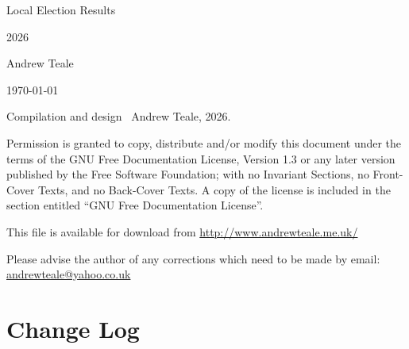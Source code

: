 \documentclass[a4paper,openany]{book}
\begin{document}

\begin{titlepage}

\begin{center}

\Huge Local Election Results

2026

\bigskip

\Large Andrew Teale

\vfill

\newcommand\versionno{0.10.1}


\today

\end{center}

\end{titlepage}


\begin{center}

%

\bigskip

Compilation and design \textcopyright\ Andrew Teale, 2026.

 Permission is granted to copy, distribute and/or modify this document
 under the terms of the GNU Free Documentation License, Version 1.3
 or any later version published by the Free Software Foundation;
 with no Invariant Sections, no Front-Cover Texts, and no Back-Cover Texts.
 A copy of the license is included in the section entitled ``GNU
 Free Documentation License''.

\bigskip

This file is available for download from
\url{http://www.andrewteale.me.uk/}

\bigskip

Please advise the author of any corrections which need to be made by
email: \url{andrewteale@yahoo.co.uk}

\vfill
\end{center}

\section*{Change Log}


%
\end{document}
